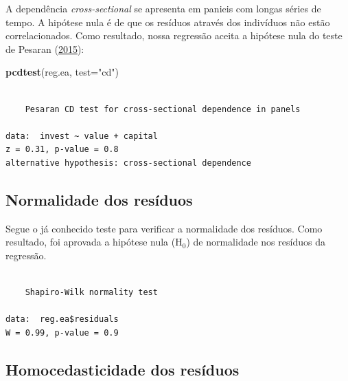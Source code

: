\documentclass[12pt,brazil,oneside]{book}
\newenvironment{Shaded}{\begin{snugshade}}{\end{snugshade}}
\newcommand{\DataTypeTok}[1]{\textcolor[rgb]{0.13,0.29,0.53}{#1}}
\newcommand{\KeywordTok}[1]{\textcolor[rgb]{0.13,0.29,0.53}{\textbf{#1}}}
\newcommand{\NormalTok}[1]{#1}
\newcommand{\OperatorTok}[1]{\textcolor[rgb]{0.81,0.36,0.00}{\textbf{#1}}}
\newcommand{\StringTok}[1]{\textcolor[rgb]{0.31,0.60,0.02}{#1}}
\begin{document}
A dependência \emph{cross-sectional} se apresenta em panieis com longas séries de tempo. A hipótese nula é de que os resíduos através dos indivíduos não estão correlacionados. Como resultado, nossa regressão aceita a hipótese nula do teste de Pesaran (\protect\hyperlink{ref-pesaran2015}{2015}):

\begin{Shaded}
\begin{Highlighting}[]
\KeywordTok{pcdtest}\NormalTok{(reg.ea, }\DataTypeTok{test=}\StringTok{"cd"}\NormalTok{)}
\end{Highlighting}
\end{Shaded}

\begin{verbatim}

    Pesaran CD test for cross-sectional dependence in panels

data:  invest ~ value + capital
z = 0.31, p-value = 0.8
alternative hypothesis: cross-sectional dependence
\end{verbatim}

\hypertarget{normalidade-dos-residuos}{%
\subsection{Normalidade dos resíduos}\label{normalidade-dos-residuos}}

Segue o já conhecido teste para verificar a normalidade dos resíduos. Como resultado, foi aprovada a hipótese nula (H\(_0\)) de normalidade nos resíduos da regressão.

\begin{Shaded}
\end{Shaded}

\begin{verbatim}

    Shapiro-Wilk normality test

data:  reg.ea$residuals
W = 0.99, p-value = 0.9
\end{verbatim}

\hypertarget{homocedasticidade-dos-residuos}{%
\subsection{Homocedasticidade dos resíduos}\label{homocedasticidade-dos-residuos}}
\end{document}
